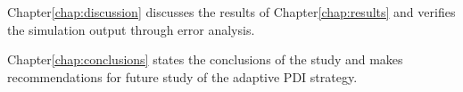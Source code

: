 Chapter\:\ref{chap:discussion} discusses the results of Chapter\:\ref{chap:results} and verifies the simulation output through error analysis.

Chapter\:\ref{chap:conclusions} states the conclusions of the study and makes recommendations for future study of the adaptive PDI strategy.


%
%
%
%
%
%
%
%
